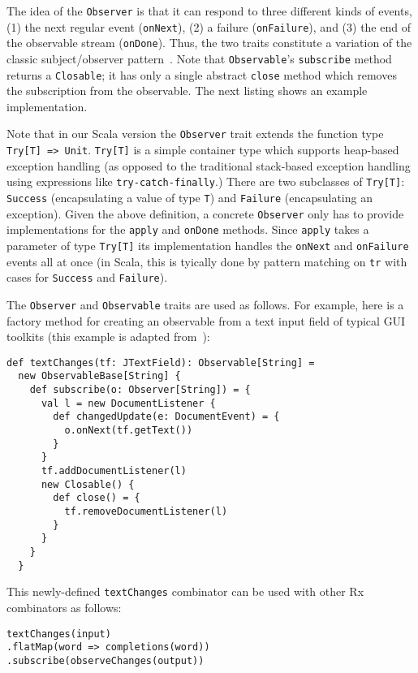 \documentclass{acm_proc_article-sp}
\begin{document}
The idea of the \verb|Observer| is that it can respond to three different
kinds of events, (1) the next regular event (\verb|onNext|), (2) a failure
(\verb|onFailure|), and (3) the end of the observable stream (\verb|onDone|).
Thus, the two traits constitute a variation of the classic subject/observer
pattern~\cite{EugsterFGK03}. Note that \verb|Observable|'s \verb|subscribe|
method returns a \verb|Closable|; it has only a single abstract \verb|close|
method which removes the subscription from the observable. The next listing
shows an example implementation.

Note that in our Scala version the \verb|Observer| trait extends the function
type \verb|Try[T] => Unit|. \verb|Try[T]| is a simple container type which
supports heap-based exception handling (as opposed to the traditional stack-based
exception handling using expressions like \verb|try-catch-finally|.)
There are two subclasses of \verb|Try[T]|: \verb|Success| (encapsulating a
value of type \verb|T|) and \verb|Failure| (encapsulating an exception). Given
the above definition, a concrete \verb|Observer| only has to provide
implementations for the \verb|apply| and \verb|onDone| methods. Since
\verb|apply| takes a parameter of type \verb|Try[T]| its implementation
handles the \verb|onNext| and \verb|onFailure| events all at once (in Scala,
this is tyically done by pattern matching on \verb|tr| with cases for
\verb|Success| and \verb|Failure|).

The \verb|Observer| and \verb|Observable| traits are used as follows. For
example, here is a factory method for creating an observable from a text input
field of typical GUI toolkits (this example is adapted from~\cite{RxCACM}):

\lstset{numbers=none,xleftmargin=0em}
\begin{lstlisting}
def textChanges(tf: JTextField): Observable[String] =
  new ObservableBase[String] {
    def subscribe(o: Observer[String]) = {
      val l = new DocumentListener {
        def changedUpdate(e: DocumentEvent) = {
          o.onNext(tf.getText())
        }
      }
      tf.addDocumentListener(l)
      new Closable() {
        def close() = {
          tf.removeDocumentListener(l)
        }
      }
    }
  }
\end{lstlisting}

This newly-defined \verb|textChanges| combinator can be used with other Rx
combinators as follows:

\begin{lstlisting}
textChanges(input)
.flatMap(word => completions(word))
.subscribe(observeChanges(output))
\end{lstlisting}
\end{document}
